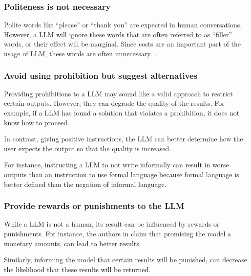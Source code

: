 \subsubsection{Politeness is not necessary}

Polite words like \enquote{please} or \enquote{thank you} are expected in human conversations. However, a  \ac{LLM} will ignore these words that are often referred to as \enquote{filler} words, or their effect will be marginal. Since costs are an important part of the usage of \ac{LLM}, these words are often unnecessary. \cite{bsharat2023principled}.

\subsubsection{Avoid using prohibition but suggest alternatives}

Providing prohibitions to a \ac{LLM} may sound like a valid approach to restrict certain outputs. However, they can degrade the quality of the results. For example, if a \ac{LLM} has found a solution that violates a prohibition, it does not know how to proceed. 

In contrast, giving positive instructions, the \ac{LLM} can better determine how the user expects the output so that the quality is increased.

For instance, instructing a \ac{LLM} to not write informally can result in worse outputs than an instruction to use formal language because formal language is better defined than the negation of informal language. \cite{prompt_engineering_jonathan}

\subsubsection{Provide rewards or punishments to the LLM}

While a \ac{LLM} is not a human, its result can be influenced by rewards or punishments. For instance, the authors in \cite{bsharat2023principled} claim that promising the model a monetary amounts, can lead to better results. 

Similarly, informing the model that certain results will be punished, can decrease the likelihood that these results will be returned. \cite{bsharat2023principled}

